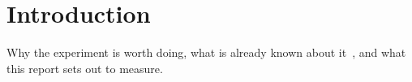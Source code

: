 \section{Introduction}
\label{sec:introduction}
Why the experiment is worth doing, what is already known about it~\cite{example},
and what this report sets out to measure.
